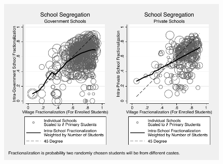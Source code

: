 \documentclass[handout]{beamer}
\begin{document}
\begin{frame}{}
	\begin{figure}[htb]
		\begin{center}		\includegraphics[scale=0.8]{graphs/intra_versus_intervillage_frac_combined.pdf}
		\end{center}
	\end{figure}
\end{frame}
\end{document}
